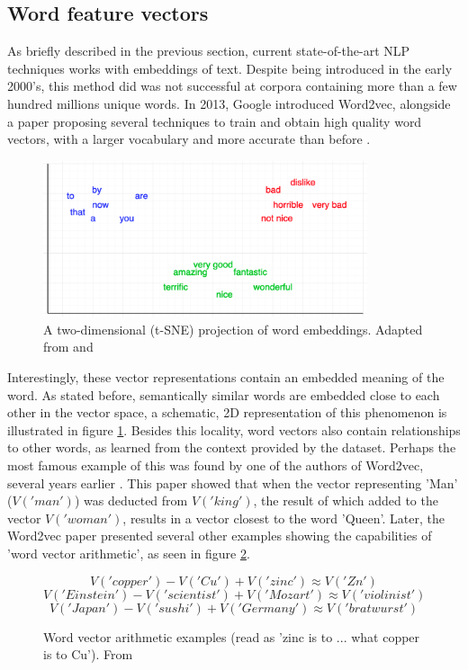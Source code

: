 \documentclass[twoside]{uva-inf-bachelor-thesis}
\begin{document}
\subsection{Word feature vectors}
As briefly described in the previous section, current state-of-the-art NLP techniques works with embeddings of text. Despite being introduced in the early 2000's, this method did was not successful at corpora containing more than a few hundred millions unique words. In 2013, Google introduced Word2vec, alongside a paper proposing several techniques to train and obtain high quality word vectors, with a larger vocabulary and more accurate than before \cite{mikolov13}.


\begin{figure}
    \centering
    \includegraphics[width=0.85\textwidth]{images/embeddings.png}
    \caption{A two-dimensional (t-SNE) projection of word embeddings. Adapted from \cite{Manning99} and \cite{li16}}
    \label{fig:embeddings}
\end{figure}

Interestingly, these vector representations contain an embedded meaning of the word. As stated before, semantically similar words are embedded close to each other in the vector space, a schematic, 2D representation of this phenomenon is illustrated in figure \ref{fig:embeddings}. Besides this locality, word vectors also contain relationships to other words, as learned from the context provided by the dataset. Perhaps the most famous example of this was found by one of the authors of Word2vec, several years earlier \cite{mikolov13_2}. This paper showed that when the vector representing 'Man' ($V('man')$) was deducted from $V('king')$, the result of which added to the vector $V('woman')$, results in a vector closest to the word 'Queen'. Later, the Word2vec paper presented several other examples showing the capabilities of 'word vector arithmetic', as seen in figure \ref{fig:vecarith}.
\begin{figure}[h]
    \centering
    $$V('copper') - V('Cu') + V('zinc') \approx V('Zn')$$
    $$V('Einstein') - V('scientist') + V('Mozart') \approx V('violinist')$$
    $$V('Japan') - V('sushi') + V('Germany') \approx V('bratwurst')$$
    \caption{Word vector arithmetic examples (read as 'zinc is to ... what copper is to Cu'). From \cite{mikolov13}}
    \label{fig:vecarith}
\end{figure}
\end{document}
